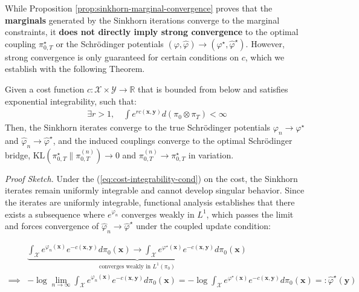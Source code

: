 \documentclass{article}
\begin{document}
While Proposition \ref{prop:sinkhorn-marginal-convergence} proves that the \textbf{marginals} generated by the Sinkhorn iterations converge to the marginal constraints, it \textbf{does not directly imply strong convergence} to the optimal coupling $\pi_{0,T}^\star$ or the Schrödinger potentials $(\varphi, \hat{\varphi})\to (\varphi^\star, \hat{\varphi}^\star)$. However, strong convergence is only guaranteed for certain conditions on $c$, which we establish with the following Theorem.

\begin{theorem}\label{theorem:sinkhorn-strong}
    Given a cost function $c:\mathcal{X}\times \mathcal{Y}\to \mathbb{R}$ that is bounded from below and satisfies exponential integrability, such that:
    \begin{align}
        \exists r > 1, \quad \int e^{r c(\boldsymbol{x},\boldsymbol{y})}d(\pi_0\otimes \pi_T)< \infty\tag{Integrability Condition}\label{eq:cost-integrability-cond}
    \end{align}
    Then, the Sinkhorn iterates converge to the true Schrödinger potentials $\varphi_n \to \varphi^\star$ and $\hat\varphi_n \to \hat\varphi^\star$, and the induced couplings converge to the optimal Schrödinger bridge, $\text{KL}(\pi^\star_{0,T}\|\pi^{(n)}_{0,T}) \to 0$ and $\pi^{(n)}_{0,T}\to \pi^\star_{0,T}$ in variation.
\end{theorem}

\textit{Proof Sketch.} Under the (\ref{eq:cost-integrability-cond}) on the cost, the Sinkhorn iterates remain uniformly integrable and cannot develop singular behavior. Since the iterates are uniformly integrable, functional analysis establishes that there exists a subsequence where $e^{\varphi_n}$ converges weakly in $L^1$, which passes the limit and forces convergence of $\hat\varphi_n \to \hat\varphi^\star$ under the coupled update condition:
\begin{small}
\begin{align}
    &\underbrace{\int_{\mathcal{X}} e^{\varphi_n(\boldsymbol{x})}e^{-c(\boldsymbol{x},\boldsymbol{y})}d\pi_0(\boldsymbol{x})\to \int_{\mathcal{X}} e^{\varphi^\star(\boldsymbol{x})}e^{-c(\boldsymbol{x},\boldsymbol{y})}d\pi_0(\boldsymbol{x})}_{\text{converges weakly in }L^1(\pi_0)}\nonumber\\
    \implies &-\log \lim_{n\to \infty}\int_{\mathcal{X}} e^{\varphi_n(\boldsymbol{x})}e^{-c(\boldsymbol{x},\boldsymbol{y})}d\pi_0(\boldsymbol{x})= \boxed{-\log \int_{\mathcal{X}} e^{\varphi^\star(\boldsymbol{x})}e^{-c(\boldsymbol{x},\boldsymbol{y})}d\pi_0(\boldsymbol{x})=:\hat\varphi^\star(\boldsymbol{y})}
\end{align}
\end{small}
\end{document}
